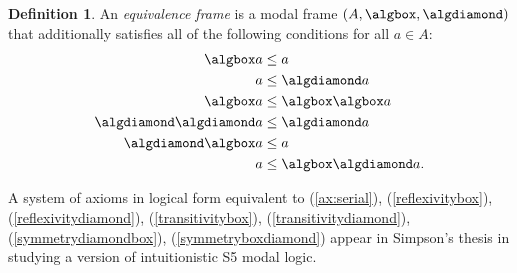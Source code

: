 \documentclass{article}[a4paper]
\theoremstyle{definition}
\newtheorem{definition}{Definition}%
\begin{document}
\begin{definition}
    An \emph{equivalence frame} is a modal frame $(A , \algbox , \algdiamond )$ that additionally satisfies all of the following conditions for all $a \in A$:
    \begin{align}
        \label{reflexivitybox}
        \algbox a 
        & \leq 
        a\\
        \label{reflexivitydiamond}
        a   
        & \leq\algdiamond 
        a\\
        \label{transitivitybox}
        \algbox a 
        & \leq 
        \algbox \algbox a\\
        \label{transitivitydiamond}
        \algdiamond \algdiamond a 
        & \leq 
        \algdiamond a \\
        \label{symmetrydiamondbox}
        \algdiamond\algbox a 
        & \leq 
        a\\
        \label{symmetryboxdiamond}
        a 
        & \leq 
        \algbox\algdiamond a .
    \end{align}
\end{definition}
A system of axioms in logical form equivalent to 
(\ref{ax:serial}), 
(\ref{reflexivitybox}), 
(\ref{reflexivitydiamond}), 
(\ref{transitivitybox}), 
(\ref{transitivitydiamond}), 
(\ref{symmetrydiamondbox}), 
(\ref{symmetryboxdiamond}) appear in Simpson's thesis \cite{simpson94} in studying a version of intuitionistic S5 modal logic.
\end{document}

